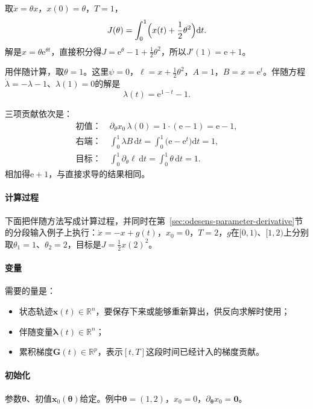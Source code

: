 \begin{example}[三个来源逐项核对]
\label{ex:odesens-adjoint-three}
取$\dot{x}=\theta x$，$x(0)=\theta$，$T=1$，
\[
 J(\theta)=\int_0^1\Bigl(x(t)+\frac12\theta^2\Bigr)\mathrm{d}t.
\]
解是$x=\theta\mathrm{e}^{\theta t}$，直接积分得$J=\mathrm{e}^{\theta}-1+\tfrac12\theta^2$，所以$J'(1)=\mathrm{e}+1$。

用伴随计算，取$\theta=1$。这里$\psi=0$，$\ell=x+\tfrac12\theta^2$，$A=1$，$B=x=\mathrm{e}^{t}$。伴随方程$\dot{\lambda}=-\lambda-1$、$\lambda(1)=0$的解是
\[
 \lambda(t)=\mathrm{e}^{1-t}-1.
\]

三项贡献依次是：
\[
 \begin{aligned}
 \text{初值：}&\ \partial_\theta x_0\,\lambda(0)=1\cdot(\mathrm{e}-1)=\mathrm{e}-1,\\
 \text{右端：}&\ \int_0^1\lambda B\,\mathrm{d}t=\int_0^1\bigl(\mathrm{e}-\mathrm{e}^{t}\bigr)\mathrm{d}t=1,\\
 \text{目标：}&\ \int_0^1\partial_\theta\ell\,\mathrm{d}t=\int_0^1\theta\,\mathrm{d}t=1.
 \end{aligned}
\]
相加得$\mathrm{e}+1$，与直接求导的结果相同。
\end{example}

\paragraph{计算过程}
下面把伴随方法写成计算过程，并同时在第~\ref{sec:odesens-parameter-derivative}节的分段输入例子上执行：$\dot{x}=-x+g(t)$，$x_0=0$，$T=2$，$g$在$[0,1)$、$[1,2)$上分别取$\theta_1=1$、$\theta_2=2$，目标是$J=\tfrac12x(2)^2$。

\paragraph{变量}
需要的量是：
\begin{itemize}
 \item 状态轨迹$\bm{x}(t)\in\mathbb{R}^{n}$，要保存下来或能够重新算出，供反向求解时使用；
 \item 伴随变量$\bm{\lambda}(t)\in\mathbb{R}^{n}$；
 \item 累积梯度$\bm{G}(t)\in\mathbb{R}^{p}$，表示$[t,T]$这段时间已经计入的梯度贡献。
\end{itemize}

\paragraph{初始化}
参数$\bm{\theta}$、初值$\bm{x}_0(\bm{\theta})$给定。例中$\bm{\theta}=(1,2)$，$x_0=0$，$\partial_{\bm{\theta}}x_0=\bm{0}$。

